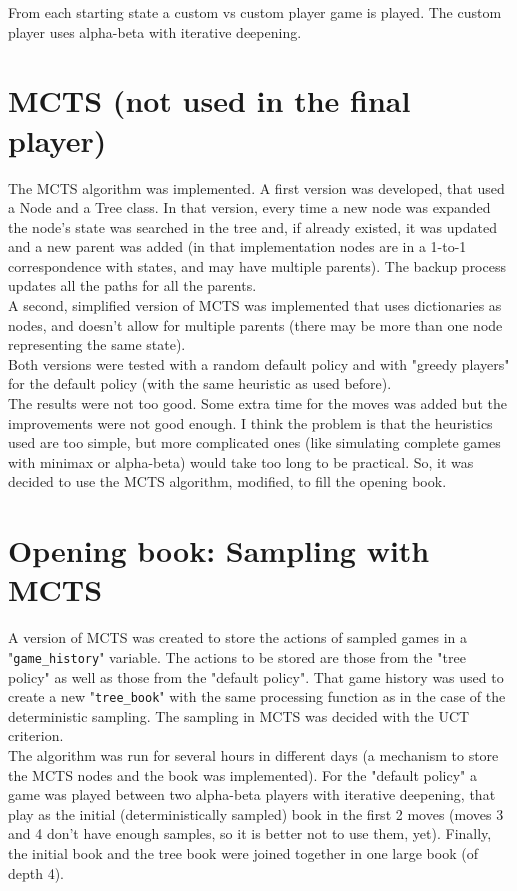 \documentclass[a4paper,12pt]{article}
\begin{document}
From each starting state a custom vs custom player game is played. The custom player uses alpha-beta with iterative deepening.

\section{MCTS (not used in the final player)}
The MCTS algorithm was implemented. A first version was developed, that used a Node and a Tree class. In that version, every time a new node was expanded the node's state was searched in the tree and, if already existed, it was updated and a new parent was added (in that implementation nodes are in a 1-to-1 correspondence with states, and may have multiple parents). The backup process updates all the paths for all the parents.\\
A second, simplified version of MCTS was implemented that uses dictionaries as nodes, and doesn't allow for multiple parents (there may be more than one node representing the same state).\\
Both versions were tested with a random default policy and with "greedy players" for the default policy (with the same heuristic as used before).\\


The results were not too good. Some extra time for the moves was added but the improvements were not good enough. I think the problem is that the heuristics used are too simple, but more complicated ones (like simulating complete games with minimax or alpha-beta) would take too long to be practical. So, it was decided to use the MCTS algorithm, modified, to fill the opening book.

\section{Opening book: Sampling with MCTS}
A version of MCTS was created to store the actions of sampled games in a "\verb+game_history+" variable. The actions to be stored are those from the "tree policy" as well as those from the "default policy". That game history was used to create a new "\verb+tree_book+" with the same processing function as in the case of the deterministic sampling. The sampling in MCTS was decided with the UCT criterion.\\
The algorithm was run for several hours in different days (a mechanism to store the MCTS nodes and the book was implemented). For the "default policy" a game was played between two alpha-beta players with iterative deepening, that play as the initial (deterministically sampled) book in the first 2 moves (moves 3 and 4 don't have enough samples, so it is better not to use them, yet).
Finally, the initial book and the tree book were joined together in one large book (of depth 4).
\end{document}
